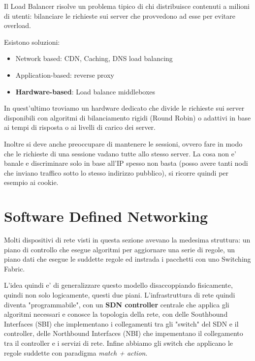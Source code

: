 Il Load Balancer risolve un problema tipico di chi distribuisce contenuti a milioni di utenti: bilanciare le richieste sui server che provvedono ad esse per evitare overload.

Esistono soluzioni:
\begin{itemize}
    \item Network based: CDN, Caching, DNS load balancing
    \item Application-based: reverse proxy
    \item \textbf{Hardware-based}: Load balance middleboxes
\end{itemize}

In quest'ultimo troviamo un hardware dedicato che divide le richieste sui server disponibili con algoritmi di bilanciamento rigidi (Round Robin) o adattivi in base ai tempi di risposta o ai livelli di carico dei server.

Inoltre si deve anche preoccupare di mantenere le sessioni, ovvero fare in modo che le richieste di una sessione vadano tutte allo stesso server. La cosa non e' banale e discriminare solo in base all'IP spesso non basta (posso avere tanti nodi che inviano traffico sotto lo stesso indirizzo pubblico), si ricorre quindi per esempio ai cookie.


\section{Software Defined Networking}

Molti dispositivi di rete visti in questa sezione avevano la medesima struttura: un piano di controllo che esegue algoritmi per aggiornare una serie di regole, un piano dati che esegue le suddette regole ed instrada i pacchetti con uno Switching Fabric.


L'idea quindi e' di generalizzare questo modello disaccoppiando fisicamente, quindi non solo logicamente, questi due piani. L'infrastruttura di rete quindi diventa "programmabile", con un \textbf{SDN controller} centrale che applica gli algoritmi necessari e conosce la topologia della rete, con delle Southbound Interfaces (SBI) che implementano i collegamenti tra gli "switch" del SDN e il controller, delle Northbound Interfaces (NBI) che impementano il collegamento tra il controller e i servizi di rete. Infine abbiamo gli switch che applicano le regole suddette con paradigma \textit{match + action}.

